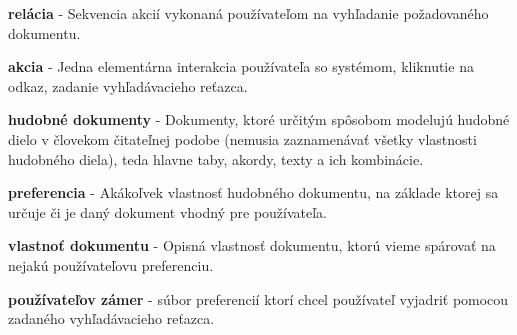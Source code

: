 \begin{my_description}
\item \textbf{relácia} - Sekvencia akcií vykonaná používateľom na vyhľadanie požadovaného dokumentu.
\item \textbf{akcia} - Jedna elementárna interakcia používateľa so systémom, kliknutie na odkaz, zadanie vyhľadávacieho reťazca.
\item \textbf{hudobné dokumenty} - Dokumenty, ktoré určitým spôsobom modelujú hudobné dielo v človekom čitateľnej podobe (nemusia zaznamenávať všetky vlastnosti hudobného diela), teda hlavne taby, akordy, texty a ich kombinácie.
\item \textbf{preferencia} - Akákoľvek vlastnosť hudobného dokumentu, na základe ktorej sa určuje či je daný dokument vhodný pre používateľa.
\item \textbf{vlastnoť dokumentu} - Opisná vlastnosť dokumentu, ktorú vieme spárovať na nejakú používateľovu preferenciu.
\item \textbf{používateľov zámer} - súbor preferencií ktorí chcel používateľ vyjadriť pomocou zadaného vyhľadávacieho reťazca.
\end{my_description}

